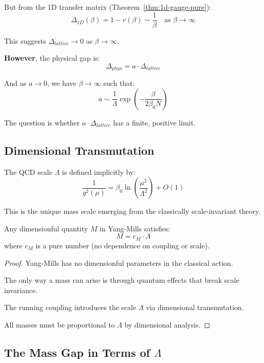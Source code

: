 But from the 1D transfer matrix (Theorem~\ref{thm:1d-gauge-pure}):
\[
\Delta_{1D}(\beta) = 1 - r(\beta) \sim \frac{1}{\beta} \quad \text{as } \beta \to \infty
\]

This suggests $\Delta_{lattice} \to 0$ as $\beta \to \infty$.

\textbf{However}, the physical gap is:
\[
\Delta_{phys} = a \cdot \Delta_{lattice}
\]

And as $a \to 0$, we have $\beta \to \infty$ such that:
\[
a \sim \frac{1}{\Lambda} \exp\left(-\frac{\beta}{2\beta_0 N}\right)
\]

The question is whether $a \cdot \Delta_{lattice}$ has a finite, positive limit.

\subsection{Dimensional Transmutation}

\begin{definition}
The QCD scale $\Lambda$ is defined implicitly by:
\[
\frac{1}{g^2(\mu)} = \beta_0 \ln\left(\frac{\mu^2}{\Lambda^2}\right) + O(1)
\]

This is the unique mass scale emerging from the classically scale-invariant theory.
\end{definition}

\begin{theorem}
\label{thm:dim-transmutation}
Any dimensionful quantity $M$ in Yang-Mills satisfies:
\[
M = c_M \cdot \Lambda
\]
where $c_M$ is a pure number (no dependence on coupling or scale).
\end{theorem}

\begin{proof}
Yang-Mills has no dimensionful parameters in the classical action.

The only way a mass can arise is through quantum effects that break scale invariance.

The running coupling introduces the scale $\Lambda$ via dimensional transmutation.

All masses must be proportional to $\Lambda$ by dimensional analysis.
\end{proof}

\subsection{The Mass Gap in Terms of \texorpdfstring{$\Lambda$}{Lambda}}

